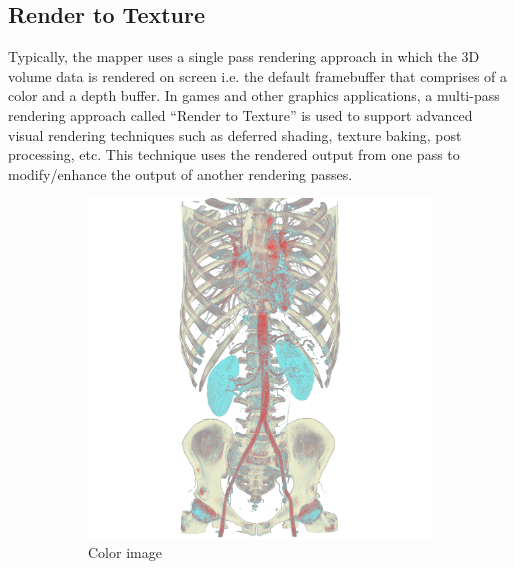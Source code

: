 \subsection{Render to Texture}
Typically, the mapper uses a single pass
rendering approach in which the 3D volume data is rendered on screen i.e. the
default framebuffer that comprises of a color and a depth buffer. In games and
other graphics applications, a multi-pass rendering approach called ``Render to
Texture'' is used to support advanced visual rendering techniques such as
deferred shading, texture baking, post processing, etc. This technique uses the
rendered output from one pass to modify/enhance the output of another rendering
passes.

\begin{figure}[ht]
\centering
  \begin{subfigure}[b]{.5\columnwidth}
    \centering
    \includegraphics[width=\textwidth]{colorimage.png}
    \caption{Color image}
    \label{fig:rendertotexturecolor}
  \end{subfigure}%
  \begin{subfigure}[b]{.5\columnwidth}
    \centering

\end{subfigure}
\end{figure}
